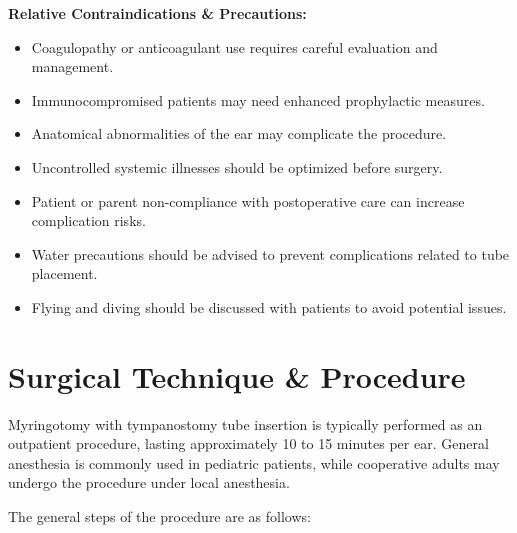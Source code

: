 \textbf{Relative Contraindications \& Precautions:}
\begin{itemize}
  \item Coagulopathy or anticoagulant use requires careful evaluation and management.
  \item Immunocompromised patients may need enhanced prophylactic measures.
  \item Anatomical abnormalities of the ear may complicate the procedure.
  \item Uncontrolled systemic illnesses should be optimized before surgery.
  \item Patient or parent non-compliance with postoperative care can increase complication risks.
  \item Water precautions should be advised to prevent complications related to tube placement.
  \item Flying and diving should be discussed with patients to avoid potential issues.
\end{itemize}

\section*{Surgical Technique \& Procedure}
Myringotomy with tympanostomy tube insertion is typically performed as an outpatient procedure, lasting approximately 10 to 15 minutes per ear. General anesthesia is commonly used in pediatric patients, while cooperative adults may undergo the procedure under local anesthesia.

The general steps of the procedure are as follows:

